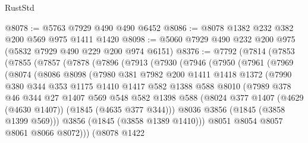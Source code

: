 \begin{lexlean}{RustStd}
\begin{coremodule}
@8078 := @5763 @7929 @490 @490 @6452
@8086 := @8078 @1382 @232 @382 @200 @569 @975 @1411 @1420
@8098 := @5060 @7929 @490 @232 @200 @975 (@5832 @7929 @490 @229 @200 @974 @6151)
@8376 := @7792
    (@7814
      (@7853
        (@7855
          (@7857
            (@7878
              (@7896
                (@7913
                  (@7930
                    (@7946
                      (@7950
                        (@7961
                          (@7969
                            (@8074
                              (@8086
                                @8098
                                (@7980
                                  @381
                                  @7982
                                  @200
                                  @1411
                                  @1418
                                  @1372
                                  (@7990
                                    @380
                                    @344
                                    @353
                                    @1175
                                    @1410
                                    @1417
                                    @582
                                    @1388
                                    @588
                                    @8010
                                    (@7989
                                      @378
                                      @46
                                      @344
                                      @27
                                      @1407
                                      @569
                                      @548
                                      @582
                                      @1398
                                      @588
                                      (@8024
                                        @377
                                        @1407
                                        (@4629 (@4630 @1407))
                                        (@1845 (@4635 @377 @344)))
                                      @8036
                                      @3856
                                      (@1845 (@3858 @1399 @569)))
                                    @3856
                                    (@1845 (@3858 @1389 @1410)))
                                  @8051
                                  @8054
                                  @8057
                                  @8061
                                  @8066
                                  @8072)))
                            (@8078
                              @1422

\end{coremodule}
\end{lexlean}
